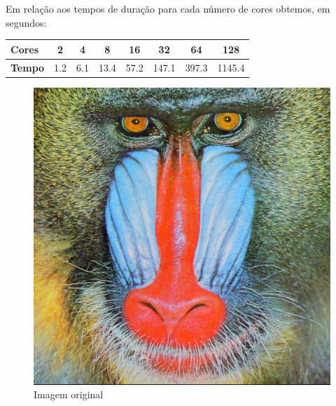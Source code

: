 \documentclass{article}
\begin{document}
Em relação aos tempos de duração para cada número de cores obtemos, em segundos:

\begin{center}
  \begin{tabular}{ | l | c | c | c | c | c | c | c | }
    \hline
    \textbf{Cores} & 2 & 4 & 8 & 16 & 32 & 64 & 128 \\ \hline
    \textbf{Tempo} & 1.2 & 6.1 & 13.4 & 57.2 & 147.1 & 397.3 & 1145.4  \\
    \hline
  \end{tabular}
\end{center}


\begin{figure}[!htb]
  \begin{minipage}{0.42\textwidth}
    \centering
    \includegraphics[width=.99\linewidth]{images/baboon.png}
    \caption{Imagem original}\label{Fig:original}
  \end{minipage}\hfill
  \begin{minipage}{0.42\textwidth}
    \centering

\end{minipage}
\end{figure}
\end{document}
